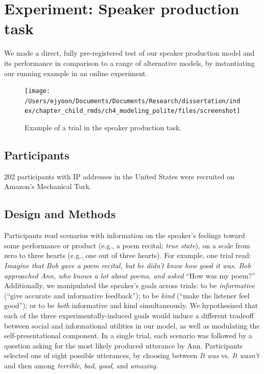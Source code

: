 \documentclass[oneside]{report}
\begin{document}
\section{Experiment: Speaker production
task}\label{experiment-speaker-production-task}

We made a direct, fully pre-registered test of our speaker production
model and its performance in comparison to a range of alternative
models, by instantiating our running example in an online experiment.
\begin{figure}[!h]

{\centering \texttt{[image: /Users/ejyoon/Documents/Documents/Research/dissertation/index/chapter\_child\_rmds/ch4\_modeling\_polite/files/screenshot]} 

}

\caption[Example of a trial in the experimental task in Chapter 4.]{Example of a trial in the speaker production task.}\label{fig:screenshot}
\end{figure}
\subsection{Participants}\label{participants-4}

202 participants with IP addresses in the United States were recruited
on Amazon's Mechanical Turk.

\subsection{Design and Methods}\label{design-and-methods}

Participants read scenarios with information on the speaker's feelings
toward some performance or product (e.g., a poem recital; \emph{true
state}), on a scale from zero to three hearts (e.g., one out of three
hearts). For example, one trial read: \emph{Imagine that Bob gave a poem
recital, but he didn't know how good it was. Bob approached Ann, who
knows a lot about poems, and asked} ``How was my poem?'' Additionally,
we manipulated the speaker's goals across trials: to be
\emph{informative} (``give accurate and informative feedback''); to be
\emph{kind} (``make the listener feel good''); or to be \emph{both}
informative and kind simultaneously. We hypothesized that each of the
three experimentally-induced goals would induce a different tradeoff
between social and informational utilities in our model, as well as
modulating the self-presentational component. In a single trial, each
scenario was followed by a question asking for the most likely produced
utterance by Ann. Participants selected one of eight possible
utterances, by choosing between \emph{It was} vs. \emph{It wasn't} and
then among \emph{terrible}, \emph{bad}, \emph{good}, and \emph{amazing.}
\end{document}
